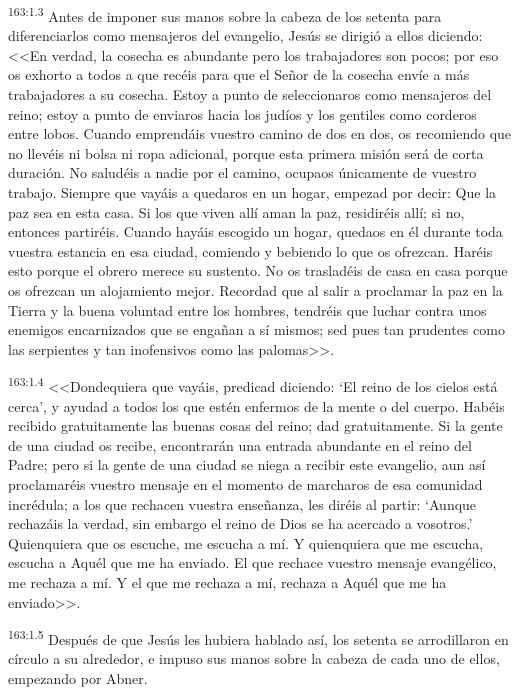 \par 
\textsuperscript{163:1.3} Antes de imponer sus manos sobre la cabeza de los setenta para diferenciarlos como mensajeros del evangelio, Jesús se dirigió a ellos diciendo: <<En verdad, la cosecha es abundante pero los trabajadores son pocos; por eso os exhorto a todos a que recéis para que el Señor de la cosecha envíe a más trabajadores a su cosecha. Estoy a punto de seleccionaros como mensajeros del reino; estoy a punto de enviaros hacia los judíos y los gentiles como corderos entre lobos. Cuando emprendáis vuestro camino de dos en dos, os recomiendo que no llevéis ni bolsa ni ropa adicional, porque esta primera misión será de corta duración. No saludéis a nadie por el camino, ocupaos únicamente de vuestro trabajo. Siempre que vayáis a quedaros en un hogar, empezad por decir: Que la paz sea en esta casa. Si los que viven allí aman la paz, residiréis allí; si no, entonces partiréis. Cuando hayáis escogido un hogar, quedaos en él durante toda vuestra estancia en esa ciudad, comiendo y bebiendo lo que os ofrezcan. Haréis esto porque el obrero merece su sustento. No os trasladéis de casa en casa porque os ofrezcan un alojamiento mejor. Recordad que al salir a proclamar la paz en la Tierra y la buena voluntad entre los hombres, tendréis que luchar contra unos enemigos encarnizados que se engañan a sí mismos; sed pues tan prudentes como las serpientes y tan inofensivos como las palomas>>.

\par 
\textsuperscript{163:1.4} <<Dondequiera que vayáis, predicad diciendo: `El reino de los cielos está cerca', y ayudad a todos los que estén enfermos de la mente o del cuerpo. Habéis recibido gratuitamente las buenas cosas del reino; dad gratuitamente. Si la gente de una ciudad os recibe, encontrarán una entrada abundante en el reino del Padre; pero si la gente de una ciudad se niega a recibir este evangelio, aun así proclamaréis vuestro mensaje en el momento de marcharos de esa comunidad incrédula; a los que rechacen vuestra enseñanza, les diréis al partir: `Aunque rechazáis la verdad, sin embargo el reino de Dios se ha acercado a vosotros.' Quienquiera que os escuche, me escucha a mí. Y quienquiera que me escucha, escucha a Aquél que me ha enviado. El que rechace vuestro mensaje evangélico, me rechaza a mí. Y el que me rechaza a mí, rechaza a Aquél que me ha enviado>>.

\par 
\textsuperscript{163:1.5} Después de que Jesús les hubiera hablado así, los setenta se arrodillaron en círculo a su alrededor, e impuso sus manos sobre la cabeza de cada uno de ellos, empezando por Abner.


